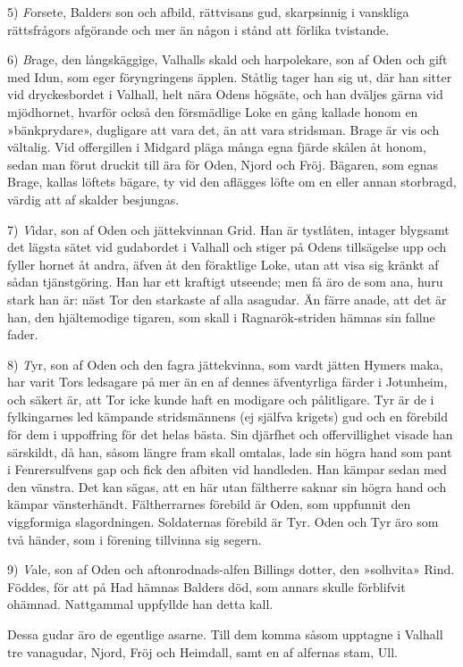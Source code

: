 5) {\emph Forsete}, Balders son och afbild, rättvisans gud, skarpsinnig i
vanskliga rättsfrågors afgörande och mer än någon i stånd att förlika
tvistande.

6) {\emph Brage}, den långskäggige, Valhalls skald och harpolekare, son
af Oden och gift med Idun, som eger föryngringens äpplen. Ståtlig tager
han sig ut, där han sitter vid dryckesbordet i Valhall, helt nära Odens
högsäte, och han dväljes gärna vid mjödhornet, hvarför också den
försmädlige Loke en gång kallade honom en »bänkprydare», dugligare att
vara det, än att vara stridsman. Brage är vis och vältalig. Vid
offergillen i Midgard pläga många egna fjärde skålen åt honom, sedan man
förut druckit till ära för Oden, Njord och Fröj. Bägaren, som egnas
Brage, kallas löftets bägare, ty vid den aflägges löfte om en eller
annan storbragd, värdig att af skalder besjungas.

7) {\emph Vidar}, son af Oden och jättekvinnan Grid. Han är tystlåten,
intager blygsamt det lägsta sätet vid gudabordet i Valhall och stiger på
Odens tillsägelse upp och fyller hornet åt andra, äfven åt den
föraktlige Loke, utan att visa sig kränkt af sådan tjänstgöring. Han har
ett kraftigt utseende; men få äro de som ana, huru stark han är: näst
Tor den starkaste af alla asagudar. Än färre anade, att det är han, den
hjältemodige tigaren, som skall i Ragnarök-striden hämnas sin fallne
fader.

8) {\emph Tyr}, son af Oden och den fagra jättekvinna, som vardt jätten
Hymers maka, har varit Tors ledsagare på mer än en af dennes
äfventyrliga färder i Jotunheim, och säkert är, att Tor icke kunde haft
en modigare och pålitligare. Tyr är de i fylkingarnes led kämpande
stridsmännens (ej själfva krigets) gud och en förebild för dem i
uppoffring för det helas bästa. Sin djärfhet och offervillighet visade
han särskildt, då han, såsom längre fram skall omtalas, lade sin högra
hand som pant i Fenrersulfvens gap och fick den afbiten vid handleden.
Han kämpar sedan med den vänstra. Det kan sägas, att en här utan
fältherre saknar sin högra hand och kämpar vänsterhändt. Fältherrarnes
förebild är
Oden, som uppfunnit den viggformiga slagordningen. Soldaternas förebild
är Tyr. Oden och Tyr äro som två händer, som i förening tillvinna sig
segern.

9) {\emph Vale}, son af Oden och aftonrodnads-alfen Billings dotter, den
»solhvita» Rind. Föddes, för att på Had hämnas Balders död, som annars
skulle förblifvit ohämnad. Nattgammal uppfyllde han detta kall.

Dessa gudar äro de egentlige asarne. Till dem komma såsom upptagne i
Valhall tre vanagudar, Njord, Fröj och Heimdall, samt en af alfernas
stam, Ull.

